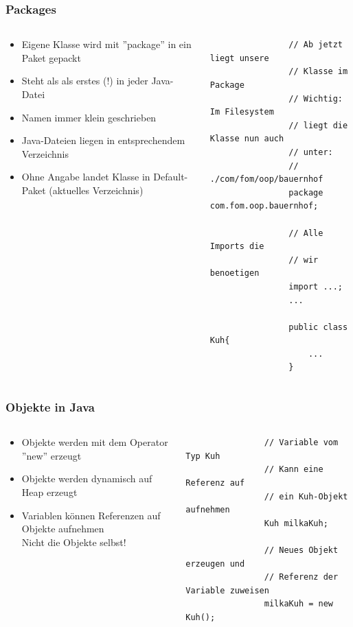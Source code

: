 \begin{frame}[fragile]
	  \frametitle{Packages}
		 \begin{columns}
		 \begin{column}{0.5\textwidth}
			  \small
			  \begin{itemize}
			  	\item Eigene Klasse wird mit ''package'' 
			  	in ein Paket gepackt
			  	\item Steht als als erstes (!) in jeder Java-Datei
			  	\item Namen immer klein geschrieben
			  	\item Java-Dateien liegen in 
			  	entsprechendem Verzeichnis
			  	\item Ohne Angabe landet Klasse in Default-Paket
			  	(aktuelles Verzeichnis)
			  \end{itemize}
		 \end{column}
		 \begin{column}{0.5\textwidth}
		 	\begin{lstlisting}
		 		// Ab jetzt liegt unsere 
		 		// Klasse im Package
		 		// Wichtig: Im Filesystem
		 		// liegt die Klasse nun auch 
		 		// unter: 
		 		// ./com/fom/oop/bauernhof
		 		package com.fom.oop.bauernhof;
		 		
		 		// Alle Imports die 
		 		// wir benoetigen
		 		import ...;
		 		...
		 		
		 		public class Kuh{
		 			...
		 		}
		 	\end{lstlisting}
		 \end{column}
		 \end{columns}
\end{frame}

\begin{frame}[fragile]
	\frametitle{Objekte in Java}
	\begin{columns}
		\begin{column}{0.5\textwidth}
			\small
			\begin{itemize}
			  \item Objekte werden mit dem Operator ''new'' erzeugt
			  \item Objekte werden dynamisch auf Heap erzeugt
			  \item Variablen k\"onnen Referenzen auf Objekte aufnehmen\\
			  		Nicht die Objekte selbst!
			\end{itemize}
		\end{column}
		\begin{column}{0.5\textwidth}
			\begin{lstlisting}
				// Variable vom Typ Kuh
				// Kann eine Referenz auf
				// ein Kuh-Objekt aufnehmen
				Kuh milkaKuh;
				
				// Neues Objekt erzeugen und
				// Referenz der Variable zuweisen
				milkaKuh = new Kuh();
			\end{lstlisting}
		\end{column}
	\end{columns}
\end{frame}

